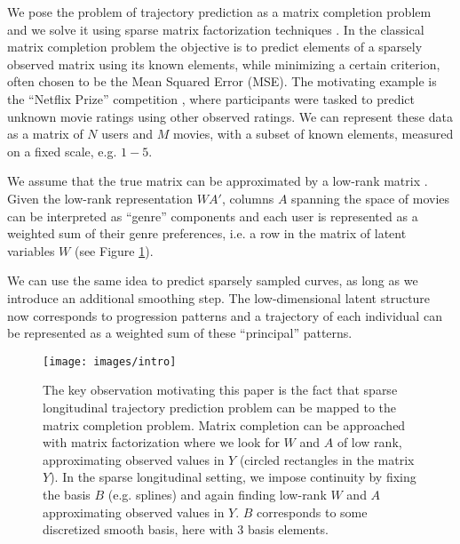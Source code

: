\documentclass[preprint]{imsart}
\numberwithin{equation}{section}
\theoremstyle{plain}
\begin{document}
We pose the problem of trajectory prediction as a matrix completion problem and we solve it using sparse matrix factorization techniques \citep{rennie2005fast, candes2009exact}. In the classical matrix completion problem the objective is to predict elements of a sparsely observed matrix using its known elements, while minimizing a certain criterion, often chosen to be the Mean Squared Error (MSE). The motivating example is the ``Netflix Prize'' competition \citep{bennett2007netflix}, where participants were tasked to predict unknown movie ratings using other observed ratings. We can represent these data as a matrix of $N$ users and $M$ movies, with a subset of known elements, measured on a fixed scale, e.g. $1-5$.

We assume that the true matrix can be approximated by a low-rank matrix \citep{srebro2005generalization}. Given the low-rank representation $WA'$, columns $A$ spanning the space of movies can be interpreted as ``genre'' components and each user is represented as a weighted sum of their genre preferences, i.e. a row in the matrix of latent variables $W$ (see Figure \ref{fig:idea}).

We can use the same idea to predict sparsely sampled curves, as long as we introduce an additional smoothing step. The low-dimensional latent structure now corresponds to progression patterns and a trajectory of each individual can be represented as a weighted sum of these ``principal'' patterns.


\begin{figure}[h]
  \texttt{[image: images/intro]}
  \caption{The key observation motivating this paper is the fact that sparse longitudinal trajectory prediction problem can be mapped to the matrix completion problem. Matrix completion can be approached with matrix factorization where we look for $W$ and $A$ of low rank, approximating observed values in $Y$ (circled rectangles in the matrix $Y$). In the sparse longitudinal setting, we impose continuity by fixing the basis $B$ (e.g. splines) and again finding low-rank $W$ and $A$ approximating observed values in $Y$. $B$ corresponds to some discretized smooth basis, here with $3$ basis elements.}
  \label{fig:idea}
\end{figure}
\end{document}
